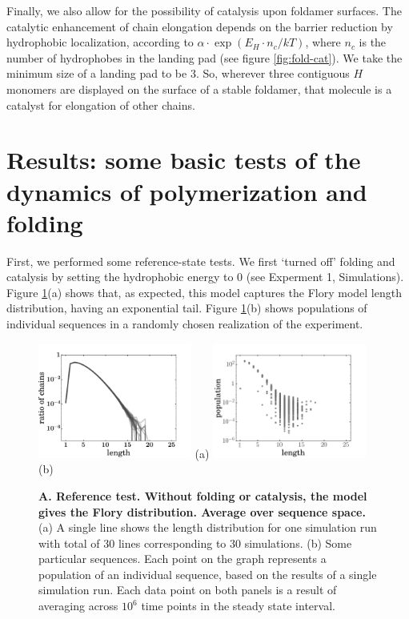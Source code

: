 \documentclass[journal=jacsat,manuscript=article,layout=twocolumn]{achemso}
\newcommand*{\ga}{\alpha}
\begin{document}
 Finally, we also allow for the possibility of catalysis upon foldamer surfaces.  The catalytic 
enhancement of chain elongation depends on the barrier reduction by hydrophobic localization, 
according to $\ga\cdot\exp(E_{H}\cdot n_{c}/kT)$, where $n_c$ is the number of hydrophobes in the 
landing pad (see figure \ref{fig:fold-cat}).  We take the minimum size of a landing pad to be 3.  
So, wherever three contiguous $H$ monomers are displayed on the surface of a stable foldamer, that 
molecule is a catalyst for elongation of other chains.
 
\section{Results: some basic tests of the dynamics of polymerization and folding}

 First, we performed some reference-state tests.  We first `turned off' folding and catalysis by 
setting the hydrophobic energy to $0$ (see Experment 1, Simulations).  Figure 
\ref{fig:sim_pure_flory}(a) 
shows that, as expected, this model captures the Flory model length distribution, having an 
exponential tail.  Figure \ref{fig:sim_pure_flory}(b) shows populations of individual sequences in a 
randomly chosen realization of the experiment.

\begin{figure}[hbt!]
  \centering
  \includegraphics[width=0.45\textwidth]{pictures/distrPlain-many.pdf} (a)
  \includegraphics[width=0.45\textwidth]{pictures/scatter01918.png} (b)
  \caption{\footnotesize{\textbf{A.  Reference test.  Without folding or catalysis, the model gives 
the Flory distribution.  Average over sequence space.}  (a) A single line shows the length 
distribution for one simulation run with total of 30 lines corresponding to 30 simulations. 
 (b) Some particular sequences. Each point on the graph represents a population of an
individual sequence, based on the results of a single simulation run. Each data point on both 
panels is a result of averaging across $10^6$ time points in the steady state interval. 
}}
  \label{fig:sim_pure_flory}
\end{figure}
\end{document}
